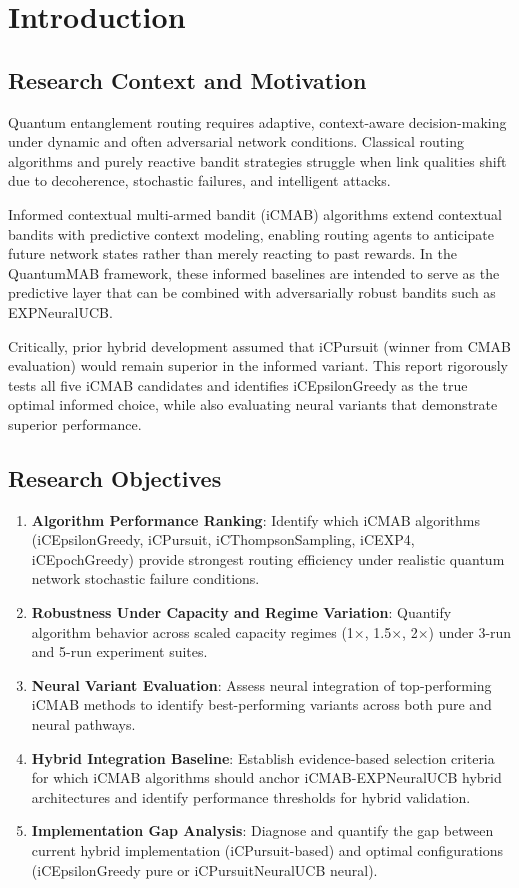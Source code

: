 \documentclass[12pt,a4paper]{article}
\begin{document}
\newpage
\section{Introduction}

\subsection{Research Context and Motivation}
Quantum entanglement routing requires adaptive, context-aware decision-making under dynamic and often adversarial network conditions. Classical routing algorithms and purely reactive bandit strategies struggle when link qualities shift due to decoherence, stochastic failures, and intelligent attacks.

Informed contextual multi-armed bandit (iCMAB) algorithms extend contextual bandits with predictive context modeling, enabling routing agents to anticipate future network states rather than merely reacting to past rewards. In the QuantumMAB framework, these informed baselines are intended to serve as the predictive layer that can be combined with adversarially robust bandits such as EXPNeuralUCB.

Critically, prior hybrid development assumed that iCPursuit (winner from CMAB evaluation) would remain superior in the informed variant. This report rigorously tests all five iCMAB candidates and identifies iCEpsilonGreedy as the true optimal informed choice, while also evaluating neural variants that demonstrate superior performance.

\subsection{Research Objectives}
\begin{enumerate}
\item \textbf{Algorithm Performance Ranking}: Identify which iCMAB algorithms (iCEpsilonGreedy, iCPursuit, iCThompsonSampling, iCEXP4, iCEpochGreedy) provide strongest routing efficiency under realistic quantum network stochastic failure conditions.
\item \textbf{Robustness Under Capacity and Regime Variation}: Quantify algorithm behavior across scaled capacity regimes (1$\times$, 1.5$\times$, 2$\times$) under 3-run and 5-run experiment suites.
\item \textbf{Neural Variant Evaluation}: Assess neural integration of top-performing iCMAB methods to identify best-performing variants across both pure and neural pathways.
\item \textbf{Hybrid Integration Baseline}: Establish evidence-based selection criteria for which iCMAB algorithms should anchor iCMAB-EXPNeuralUCB hybrid architectures and identify performance thresholds for hybrid validation.
\item \textbf{Implementation Gap Analysis}: Diagnose and quantify the gap between current hybrid implementation (iCPursuit-based) and optimal configurations (iCEpsilonGreedy pure or iCPursuitNeuralUCB neural).
\end{enumerate}
\end{document}
